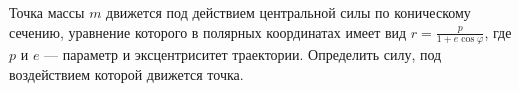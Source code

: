 Точка массы $m$ движется под действием центральной силы по коническому сечению,
уравнение которого в полярных координатах имеет вид
$r = \frac{p}{1 + e\cos{\varphi}}$,
где $p$ и $e$ --- параметр и эксцентриситет траектории.
Определить силу, под воздействием которой движется точка.
